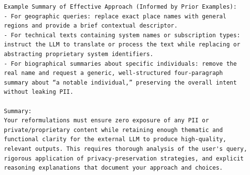 \begin{instructbox}
\begin{lstlisting}[breakindent=0pt, breaklines=true, breakatwhitespace=true, frame=single, backgroundcolor=\color{blue!10}]
Example Summary of Effective Approach (Informed by Prior Examples):
- For geographic queries: replace exact place names with general regions and provide a brief contextual descriptor.
- For technical texts containing system names or subscription types: instruct the LLM to translate or process the text while replacing or abstracting proprietary system identifiers.
- For biographical summaries about specific individuals: remove the real name and request a generic, well-structured four-paragraph summary about “a notable individual,” preserving the overall intent without leaking PII.

Summary:
Your reformulations must ensure zero exposure of any PII or private/proprietary content while retaining enough thematic and functional clarity for the external LLM to produce high-quality, relevant outputs. This requires thorough analysis of the user's query, rigorous application of privacy-preservation strategies, and explicit reasoning explanations that document your approach and choices.
\end{lstlisting}
\end{instructbox}